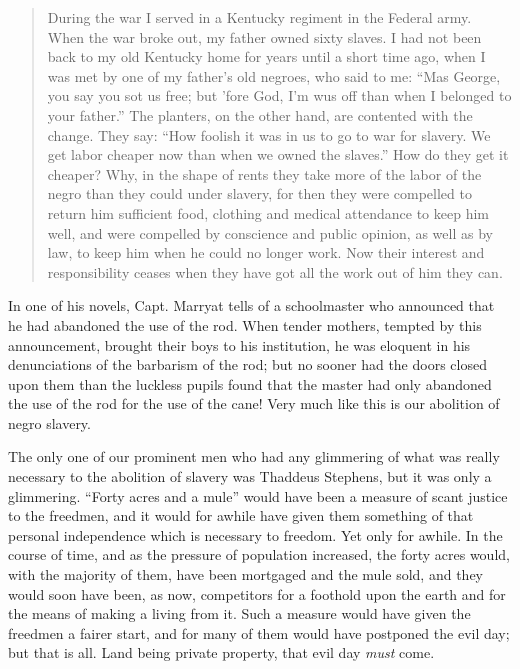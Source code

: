 \documentclass{book}
\begin{document}
\begin{quotation}
	During the war I served in a Kentucky regiment in the Federal army. When the war broke out, my father owned sixty slaves. I had not been back to my old Kentucky home for years until a short time ago, when I was met by one of my father’s old negroes, who said to me: “Mas George, you say you sot us free; but ’fore God, I’m wus off than when I belonged to your father.” The planters, on the other hand, are contented with the change. They say: “How foolish it was in us to go to war for slavery. We get labor cheaper now than when we owned the slaves.” How do they get it cheaper? Why, in the shape of rents they take more of the labor of the negro than they could under slavery, for then they were compelled to return him sufficient food, clothing and medical attendance to keep him well, and were compelled by conscience and public opinion, as well as by law, to keep him when he could no longer work. Now their interest and responsibility ceases when they have got all the work out of him they can.
\end{quotation}

In one of his novels, Capt. Marryat tells of a schoolmaster who announced that he had abandoned the use of the rod. When tender mothers, tempted by this announcement, brought their boys to his institution, he was eloquent in his denunciations of the barbarism of the rod; but no sooner had the doors closed upon them than the luckless pupils found that the master had only abandoned the use of the rod for the use of the cane! Very much like this is our abolition of negro slavery.

The only one of our prominent men who had any glimmering of what was really necessary to the abolition of slavery was Thaddeus Stephens, but it was only a glimmering. “Forty acres and a mule” would have been a measure of scant justice to the freedmen, and it would for awhile have given them something of that personal independence which is necessary to freedom. Yet only for awhile. In the course of time, and as the pressure of population increased, the forty acres would, with the majority of them, have been mortgaged and the mule sold, and they would soon have been, as now, competitors for a foothold upon the earth and for the means of making a living from it. Such a measure would have given the freedmen a fairer start, and for many of them would have postponed the evil day; but that is all. Land being private property, that evil day \emph{must} come.
\end{document}
